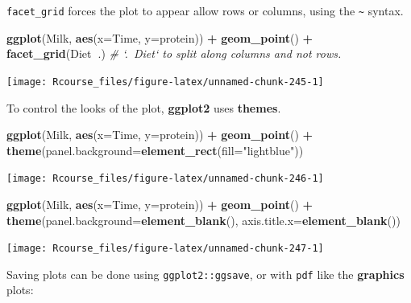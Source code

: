 \documentclass[]{book}
\newenvironment{Shaded}{\begin{snugshade}}{\end{snugshade}}
\newcommand{\KeywordTok}[1]{\textcolor[rgb]{0.13,0.29,0.53}{\textbf{#1}}}
\newcommand{\DataTypeTok}[1]{\textcolor[rgb]{0.13,0.29,0.53}{#1}}
\newcommand{\StringTok}[1]{\textcolor[rgb]{0.31,0.60,0.02}{#1}}
\newcommand{\CommentTok}[1]{\textcolor[rgb]{0.56,0.35,0.01}{\textit{#1}}}
\newcommand{\OperatorTok}[1]{\textcolor[rgb]{0.81,0.36,0.00}{\textbf{#1}}}
\newcommand{\NormalTok}[1]{#1}
\theoremstyle{definition}
\theoremstyle{definition}
\theoremstyle{definition}
\theoremstyle{remark}
\begin{document}
\texttt{facet\_grid} forces the plot to appear allow rows or columns,
using the \texttt{\textasciitilde{}} syntax.

\begin{Shaded}
\begin{Highlighting}[]
\KeywordTok{ggplot}\NormalTok{(Milk, }\KeywordTok{aes}\NormalTok{(}\DataTypeTok{x=}\NormalTok{Time, }\DataTypeTok{y=}\NormalTok{protein)) }\OperatorTok{+}
\StringTok{  }\KeywordTok{geom_point}\NormalTok{() }\OperatorTok{+}
\StringTok{  }\KeywordTok{facet_grid}\NormalTok{(Diet}\OperatorTok{~}\NormalTok{.) }\CommentTok{# `.~Diet` to split along columns and not rows.}
\end{Highlighting}
\end{Shaded}

\texttt{[image: Rcourse\_files/figure-latex/unnamed-chunk-245-1]}

To control the looks of the plot, \textbf{ggplot2} uses \textbf{themes}.

\begin{Shaded}
\begin{Highlighting}[]
\KeywordTok{ggplot}\NormalTok{(Milk, }\KeywordTok{aes}\NormalTok{(}\DataTypeTok{x=}\NormalTok{Time, }\DataTypeTok{y=}\NormalTok{protein)) }\OperatorTok{+}
\StringTok{  }\KeywordTok{geom_point}\NormalTok{() }\OperatorTok{+}
\StringTok{  }\KeywordTok{theme}\NormalTok{(}\DataTypeTok{panel.background=}\KeywordTok{element_rect}\NormalTok{(}\DataTypeTok{fill=}\StringTok{"lightblue"}\NormalTok{))}
\end{Highlighting}
\end{Shaded}

\texttt{[image: Rcourse\_files/figure-latex/unnamed-chunk-246-1]}

\begin{Shaded}
\begin{Highlighting}[]
\KeywordTok{ggplot}\NormalTok{(Milk, }\KeywordTok{aes}\NormalTok{(}\DataTypeTok{x=}\NormalTok{Time, }\DataTypeTok{y=}\NormalTok{protein)) }\OperatorTok{+}
\StringTok{  }\KeywordTok{geom_point}\NormalTok{() }\OperatorTok{+}
\StringTok{  }\KeywordTok{theme}\NormalTok{(}\DataTypeTok{panel.background=}\KeywordTok{element_blank}\NormalTok{(),}
        \DataTypeTok{axis.title.x=}\KeywordTok{element_blank}\NormalTok{())}
\end{Highlighting}
\end{Shaded}

\texttt{[image: Rcourse\_files/figure-latex/unnamed-chunk-247-1]}

Saving plots can be done using \texttt{ggplot2::ggsave}, or with
\texttt{pdf} like the \textbf{graphics} plots:
\end{document}
